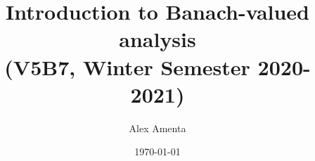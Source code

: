 \title{Introduction to Banach-valued analysis \\ (V5B7, Winter Semester 2020-2021)}
\date{\today}

\author[A. Amenta]{Alex Amenta}
\address{\noindent Mathematisches Institut \newline \indent Universit\"at Bonn, Bonn, Germany}


